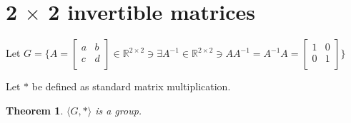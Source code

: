 \documentclass[12pt]{article}
\newcommand{\reals}{\mathbb{R}}
\newtheorem{thm}{Theorem}
\begin{document}
\section{2 $\times$ 2 invertible matrices}

Let $G = \{A = \begin{bmatrix} a & b \\ c & d \\ \end{bmatrix} \in \reals^{2 \times 2} \ni \exists A^{-1} \in \reals^{2 \times 2} \ni AA^{-1} = A^{-1}A = \begin{bmatrix} 1 & 0 \\ 0 & 1 \\ \end{bmatrix} \}$

\noindent Let $*$ be defined as standard matrix multiplication.

\begin{thm} \label{thm:7}
	$\langle G,* \rangle$ is a group.
\end{thm}
\end{document}
